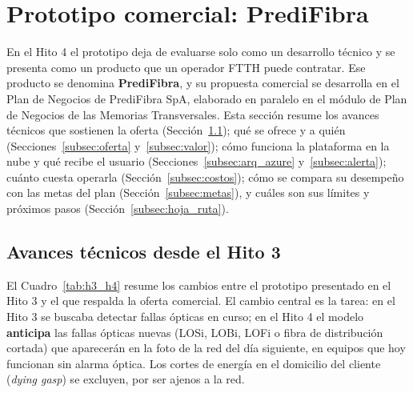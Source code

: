 \documentclass[12pt,a4paper]{article}
\begin{document}
\section{Prototipo comercial: PrediFibra}
\label{sec:predifibra}
\noindent
En el Hito 4 el prototipo deja de evaluarse solo como un desarrollo técnico y se presenta como un producto que un operador FTTH puede contratar. Ese producto se denomina \textbf{PrediFibra}, y su propuesta comercial se desarrolla en el Plan de Negocios de PrediFibra SpA, elaborado en paralelo en el módulo de Plan de Negocios de las Memorias Transversales. Esta sección resume los avances técnicos que sostienen la oferta (Sección~\ref{subsec:avances_h4}); qué se ofrece y a quién (Secciones~\ref{subsec:oferta} y~\ref{subsec:valor}); cómo funciona la plataforma en la nube y qué recibe el usuario (Secciones~\ref{subsec:arq_azure} y~\ref{subsec:alerta}); cuánto cuesta operarla (Sección~\ref{subsec:costos}); cómo se compara su desempeño con las metas del plan (Sección~\ref{subsec:metas}), y cuáles son sus límites y próximos pasos (Sección~\ref{subsec:hoja_ruta}).

\subsection{Avances técnicos desde el Hito 3}
\label{subsec:avances_h4}
\noindent
El Cuadro~\ref{tab:h3_h4} resume los cambios entre el prototipo presentado en el Hito 3 y el que respalda la oferta comercial. El cambio central es la tarea: en el Hito 3 se buscaba detectar fallas ópticas en curso; en el Hito 4 el modelo \textbf{anticipa} las fallas ópticas nuevas (LOSi, LOBi, LOFi o fibra de distribución cortada) que aparecerán en la foto de la red del día siguiente, en equipos que hoy funcionan sin alarma óptica. Los cortes de energía en el domicilio del cliente (\textit{dying gasp}) se excluyen, por ser ajenos a la red.
\end{document}
